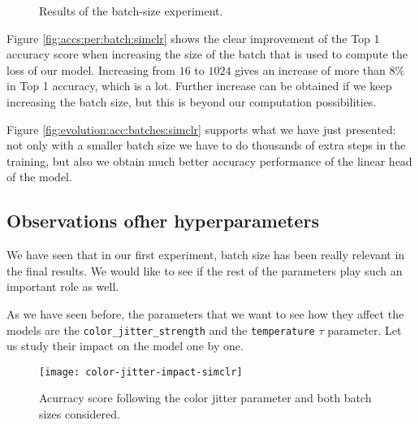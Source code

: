 \begin{figure}[htp] 
    \centering
    \hfill%
        \caption{Results of the batch-size experiment.}
\end{figure}

Figure \ref{fig:accs:per:batch:simclr} shows the clear improvement of the Top 1 accuracy score when increasing the size of the batch that is used to compute the loss of our model. Increasing from $16$ to $1024$ gives an increase of more than $8\%$ in Top 1 accuracy, which is a lot. Further increase can be obtained if we keep increasing the batch size, but this is beyond our computation possibilities.

Figure \ref{fig:evolution:acc:batches:simclr} supports what we have just presented: not only with a smaller batch size we have to do thousands of extra steps in the training, but also we obtain much better accuracy performance of the linear head of the model.

\subsection*{Observations ofher hyperparameters}

We have seen that in our first experiment, batch size has been really relevant in the final results. We would like to see if the rest of the parameters play such an important role as well. 

As we have seen before, the parameters that we want to see how they affect the models are the \lstinline{color_jitter_strength} and the \lstinline{temperature} $\tau$ parameter. Let us study their impact on the model one by one. 

\begin{figure}[H] 
    \centering
    \texttt{[image: color-jitter-impact-simclr]}%
    
    \caption{Acurracy score following the color jitter parameter and both batch sizes considered.}
    
    \label{exp:simclr:colorjitter:impact}
\end{figure}

